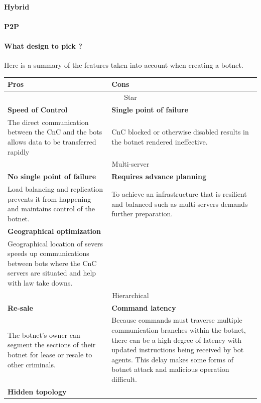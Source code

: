 \paragraph{Hybrid}
\paragraph{P2P}

\paragraph{What design to pick ?} Here is a summary of the features taken into account when creating a botnet.\\
\begin{tabular}{|p{7cm}|p{7cm}|}
\hline
Pros & Cons \\
\hline
\multicolumn{2}{|c|}{Star}\\
\hline
\textbf{Speed of Control} &\textbf{ Single point of failure}\\
The direct communication between the CnC and the bots allows data to be transferred rapidly & CnC blocked or otherwise disabled results in the botnet rendered ineffective.\\
\hline
\multicolumn{2}{|c|}{Multi-server}\\
\hline
\textbf{No single point of failure} & \textbf{Requires advance planning}\\
Load balancing and replication prevents it from happening and maintains control of the botnet. & To achieve an infrastructure that is resilient and balanced such as multi-servers demands further preparation.\\
\textbf{Geographical optimization} & \\
Geographical location of severs speeds up communications between bots where the CnC servers are situated and help with law take downs.&\\
\hline
\multicolumn{2}{|c|}{Hierarchical}\\
\hline
\textbf{Re-sale} & \textbf{Command latency}\\
The botnet's owner can segment the sections of their botnet for lease or resale to other criminals. & Because commands must traverse
multiple communication branches within the botnet, there can be a high degree of latency with updated instructions being received by bot agents. This delay makes some forms of botnet attack and malicious operation difficult.\\
\textbf{Hidden topology} &\\

\end{tabular}
